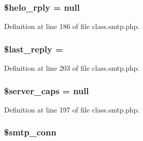 \subsubsection[{\texorpdfstring{\$helo\+\_\+rply}{$helo_rply}}]{\setlength{\rightskip}{0pt plus 5cm}\$helo\+\_\+rply = null\hspace{0.3cm}{\ttfamily [protected]}}\hypertarget{class_s_m_t_p_ab3ac5873d7f4a2cb378440532aec336e}{}\label{class_s_m_t_p_ab3ac5873d7f4a2cb378440532aec336e}


Definition at line 186 of file class.\+smtp.\+php.

\subsubsection[{\texorpdfstring{\$last\+\_\+reply}{$last_reply}}]{\setlength{\rightskip}{0pt plus 5cm}\$last\+\_\+reply = \textquotesingle{}\textquotesingle{}\hspace{0.3cm}{\ttfamily [protected]}}\hypertarget{class_s_m_t_p_a02b4360fc11497c217a66518ca6f09ff}{}\label{class_s_m_t_p_a02b4360fc11497c217a66518ca6f09ff}


Definition at line 203 of file class.\+smtp.\+php.

\subsubsection[{\texorpdfstring{\$server\+\_\+caps}{$server_caps}}]{\setlength{\rightskip}{0pt plus 5cm}\$server\+\_\+caps = null\hspace{0.3cm}{\ttfamily [protected]}}\hypertarget{class_s_m_t_p_ac93a6162b0ecb254be5fdcaa385b2c5c}{}\label{class_s_m_t_p_ac93a6162b0ecb254be5fdcaa385b2c5c}


Definition at line 197 of file class.\+smtp.\+php.

\subsubsection[{\texorpdfstring{\$smtp\+\_\+conn}{$smtp_conn}}]{\setlength{\rightskip}{0pt plus 5cm}\$smtp\+\_\+conn\hspace{0.3cm}{\ttfamily [protected]}}\hypertarget{class_s_m_t_p_a11fc42e903bf60dedd8cd6e06e84e419}{}\label{class_s_m_t_p_a11fc42e903bf60dedd8cd6e06e84e419}


